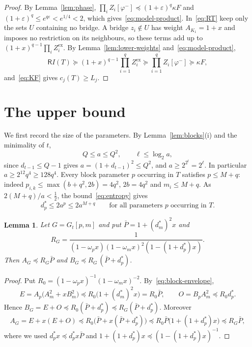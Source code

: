 \documentclass[11pt]{amsart}
\newtheorem{lemma}[theorem]{Lemma}
\theoremstyle{definition}
\theoremstyle{remark}
\numberwithin{equation}{section}
\newcommand{\R}{\mathsf{R}}
\begin{document}
\begin{proof}
By Lemma~\ref{lem:phase}, $\prod_iZ_i[\varphi^-]\preceq(1+\varepsilon)^q\kappa F$ and $(1+\varepsilon)^q\le e^{q\varepsilon}<e^{1/4}<2$, which gives~\eqref{eq:model-product}. In~\eqref{eq:RT} keep only the sets $U$ containing no bridge. A bridge $z_i\notin U$ has weight $A_{K_1}=1+x$ and imposes no restriction on its neighbours, so these terms add up to $(1+x)^{q-1}\prod_iZ_i^{\mathrm{ex}}$. By Lemma~\ref{lem:lower-weights} and~\eqref{eq:model-product},
\[
\R I(T)\succeq(1+x)^{q-1}\prod_{i=1}^qZ_i^{\mathrm{ex}}\succeq\prod_{i=1}^qZ_i[\varphi^-]\succeq\kappa F,
\]
and~\eqref{eq:KF} gives $c_j(T)\ge L_j$.
\end{proof}

\section{The upper bound}\label{sec:upper}

We first record the size of the parameters. By Lemma~\ref{lem:blocks}(i) and the minimality of $t$,
\begin{equation}\label{eq:a-size}
Q\le a\le Q^2,\qquad\ell\le\log_2a,
\end{equation}
since $d_{t-1}\le Q-1$ gives $a=(1+d_{t-1})^2\le Q^2$, and $a\ge2^{2^t}=2^\ell$. In particular $a\ge2^{12}q^4\ge128q^4$. Every block parameter $p$ occurring in $T$ satisfies $p\le M+q$: indeed $p_{i,k}\le\max(b+q^2,2b)=4q^2$, $2b=4q^2$ and $m_i\le M+q$. As $2(M+q)/a<\frac12$, the bound~\eqref{eq:entropy} gives
\begin{equation}\label{eq:d-small}
d_p^\ast\le2a^p\le2a^{M+q}\qquad\text{for all parameters }p\text{ occurring in }T.
\end{equation}

\begin{lemma}\label{lem:site-envelope}
Let $G=G_t[p,m]$ and put $\bar P=1+(d_m^\ast)^2x$ and
\[
R_G=\frac1{(1-\omega_px)(1-\omega_mx)^2(1-(1+d^\ast_p)x)}.
\]
Then $A_G\preceq R_G\bar P$ and $B_G\preceq R_G\,(\bar P+d^\ast_p)$.
\end{lemma}

\begin{proof}
Put $R_0=(1-\omega_px)^{-1}(1-\omega_mx)^{-2}$. By~\eqref{eq:block-envelope},
\[
E=A_p\bigl(A_m^2+xB_m^2\bigr)\preceq R_0\bigl(1+(d_m^\ast)^2x\bigr)=R_0\bar P,\qquad O=B_pA_m^2\preceq R_0d^\ast_p.
\]
Hence $B_G=E+O\preceq R_0(\bar P+d^\ast_p)\preceq R_G(\bar P+d_p^\ast)$. Moreover
\[
A_G=E+x(E+O)\preceq R_0\bigl(\bar P+x(\bar P+d_p^\ast)\bigr)\preceq R_0\bar P\bigl(1+(1+d^\ast_p)x\bigr)\preceq R_G\bar P,
\]
where we used $d^\ast_px\preceq d^\ast_px\bar P$ and $1+(1+d_p^\ast)x\preceq(1-(1+d_p^\ast)x)^{-1}$.
\end{proof}
\end{document}

